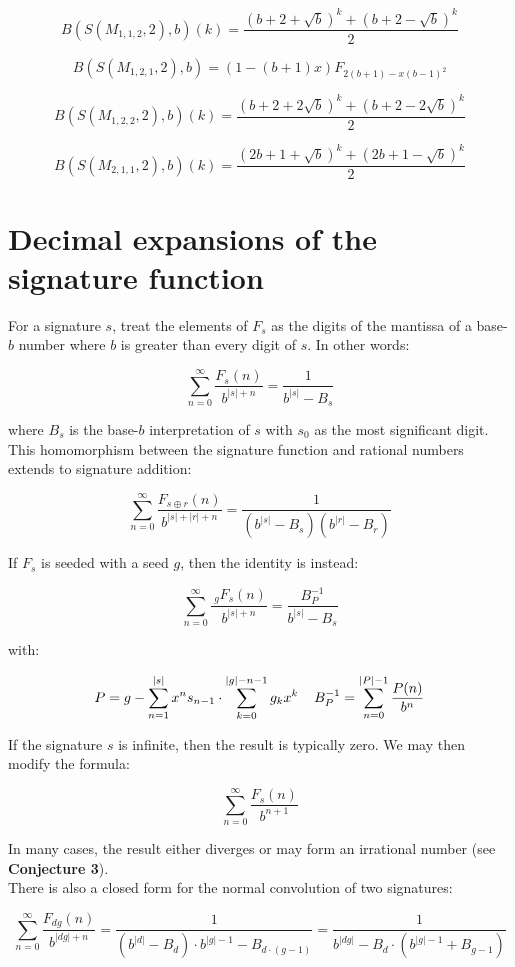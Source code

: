 \documentclass{article}
\begin{document}
$$B(S(M_{1, 1, 2}, 2), b)(k) = \frac{(b+2+\sqrt{b})^k + (b+2-\sqrt{b})^k}{2} $$

$$B(S(M_{1,2,1}, 2), b) = (1 - (b+1)x) F_{2(b+1) - x(b-1)^2}$$

$$B(S(M_{1,2,2}, 2), b)(k) = \frac{(b + 2 + 2 \sqrt{b})^k + (b + 2 - 2 \sqrt{b})^k}{2}$$

$$B(S(M_{2,1,1}, 2), b)(k) = \frac{(2b + 1 + \sqrt{b})^k + (2b + 1 - \sqrt{b})^k}{2}$$
\fi

\section{Decimal expansions of the signature function}

For a signature $s$, treat the elements of $F_s$ as the digits of the mantissa of a base-$b$ number where $b$ is greater than every digit of $s$. In other words:

$$\sum_{n=0}^{\infty} \frac{F_s(n)}{b^{|s| + n}} = \frac{1}{b^{|s|} - B_s}$$

\noindent where $B_s$ is the base-$b$ interpretation of $s$ with $s_0$ as the most significant digit. This homomorphism between the signature function and rational numbers extends to signature addition:

$$\sum_{n=0}^{\infty} \frac{F_{s \oplus r}(n)}{b^{|s| + |r| + n}} = \frac{1}{(b^{|s|} - B_s)(b^{|r|} - B_r)}$$

\noindent If $F_s$ is seeded with a seed $g$, then the identity is instead:

$$\sum_{n=0}^{\infty} \frac{~_g F_s(n)}{b^{|s| + n}} = \frac{B_P^{-1}}{b^{|s|} - B_s}$$

\noindent with:

$$P = g - \sum_{n=1}^{|s|} x^n s_{n-1} \cdot \sum_{k=0}^{|g|-n-1} g_k x^k \hspace{4mm} B_P^{-1} = \sum_{n=0}^{|P|-1} \frac{P(n)}{b^n}$$

\noindent If the signature $s$ is infinite, then the result is typically zero. We may then modify the formula:

$$\sum_{n=0}^{\infty} \frac{F_{s}(n)}{b^{n+1}}$$

\noindent In many cases, the result either diverges or may form an irrational number (see \textbf{Conjecture 3}).\\

\noindent There is also a closed form for the normal convolution of two signatures:

$$\sum_{n=0}^{\infty} \frac{F_{dg}(n)}{b^{|dg| + n}} = \frac{1}{(b^{|d|} - B_d) \cdot b^{|g|-1} - B_{d \cdot (g-1)}} = \frac{1}{b^{|dg|} - B_d \cdot (b^{|g|-1} + B_{g-1})}$$
\end{document}
